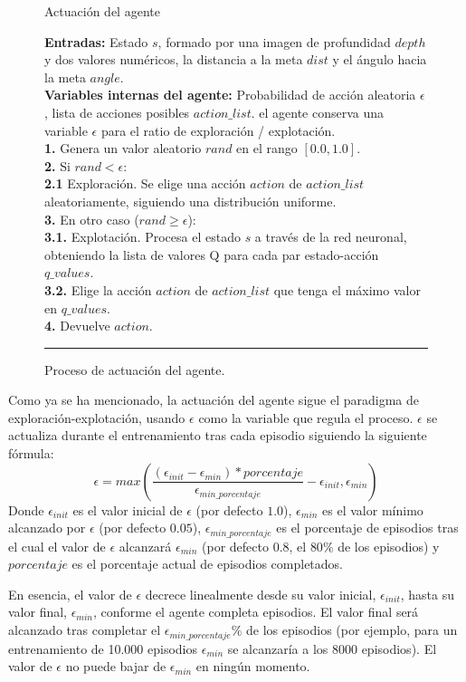 \begin{figure}[h]
\begin{algorithm}[H]
\caption{Actuación del agente}
\textbf{Entradas:} Estado $s$, formado por una imagen de profundidad $depth$ y dos valores numéricos, la distancia a la meta $dist$ y  el ángulo hacia la meta $angle$.\\
\textbf{Variables internas del agente:} Probabilidad de acción aleatoria $\epsilon$, lista de acciones posibles $action\_list$.
 el agente conserva una variable $\epsilon$ para el ratio de exploración / explotación.\\
\textbf{1.} Genera un valor aleatorio $rand$ en el rango $[0.0, 1.0]$.\\
\textbf{2.} Si $rand < \epsilon$:\\
\Indp \textbf{2.1} Exploración. Se elige una acción $action$ de $action\_list$ aleatoriamente, siguiendo una distribución uniforme.\\
\Indm \textbf{3.} En otro caso ($rand \geq \epsilon$):\\
\Indp \textbf{3.1.} Explotación. Procesa el estado $s$ a través de la red neuronal, obteniendo la lista de valores Q para cada par estado-acción $q\_values$.\\
\textbf{3.2.} Elige la acción $action$ de $action\_list$ que tenga el máximo valor en $q\_values$.\\
\Indm \textbf{4.} Devuelve $action$.
\end{algorithm}
\hrule
\caption{Proceso de actuación del agente.}
\label{alg:act}
\end{figure}

Como ya se ha mencionado, la actuación del agente sigue el paradigma de exploración-explotación, usando $\epsilon$ como la variable que regula el proceso. $\epsilon$ se actualiza durante el entrenamiento tras cada episodio siguiendo la siguiente fórmula:
\[\epsilon= max\left( \frac{(\epsilon_{init} - \epsilon_{min}) * porcentaje}{\epsilon_{min\_porcentaje}} - \epsilon_{init}, \epsilon_{min} \right)\]
Donde $\epsilon_{init}$ es el valor inicial de $\epsilon$ (por defecto $1.0$), $\epsilon_{min}$ es el valor mínimo alcanzado por $\epsilon$ (por defecto $0.05$), $\epsilon_{min\_porcentaje}$ es el porcentaje de episodios tras el cual el valor de $\epsilon$ alcanzará $\epsilon_{min}$ (por defecto $0.8$, el $80\%$ de los episodios) y $porcentaje$ es el porcentaje actual de episodios completados.

En esencia, el valor de $\epsilon$ decrece linealmente desde su valor inicial, $\epsilon_{init}$, hasta su valor final, $\epsilon_{min}$, conforme el agente completa episodios. El valor final será alcanzado tras completar el $\epsilon_{min\_porcentaje}\%$ de los episodios (por ejemplo, para un entrenamiento de 10.000 episodios $\epsilon_{min}$ se alcanzaría a los 8000 episodios). El valor de $\epsilon$ no puede bajar de $\epsilon_{min}$ en ningún momento.

